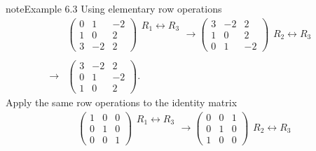 \documentclass[letterpaper,10pt,english]{jupyterBook}
\begin{document}
\begin{sphinxadmonition}{note}{Example 6.3}
\sphinxAtStartPar
Using elementary row operations
\begin{align*}
    &\begin{pmatrix}
        0 & 1 & -2\\
        1 & 0 & 2\\
        3 & -2 & 2
    \end{pmatrix}
    \begin{array}{l} R_1 \leftrightarrow R_3 \\ \phantom{x} \\ \phantom{x} \end{array}
    \longrightarrow 
    \begin{pmatrix}
        3 & -2 & 2\\
        1 & 0 & 2\\
        0 & 1 & -2
    \end{pmatrix}
    \begin{array}{l} \phantom{x} \\ R_2 \leftrightarrow R_3 \\ \phantom{x} \end{array} \\ \\
    \longrightarrow
    &\begin{pmatrix}
        3 & -2 & 2\\
        0 & 1 & -2\\
        1 & 0 & 2
    \end{pmatrix}.
\end{align*}
\sphinxAtStartPar
Apply the same row operations to the identity matrix
\begin{align*}
    &\begin{pmatrix}
        1 & 0 & 0 \\
        0 & 1 & 0 \\
        0 & 0 & 1
    \end{pmatrix}
    \begin{array}{l} R_1 \leftrightarrow R_3 \\ \phantom{x} \\ \phantom{x} \end{array}
    \longrightarrow 
    \begin{pmatrix}
        0 & 0 & 1 \\
        0 & 1 & 0 \\
        1 & 0 & 0
    \end{pmatrix}
    \begin{array}{l} \phantom{x} \\ R_2 \leftrightarrow R_3 \\ \phantom{x} \end{array} \\ \\

\end{align*}
\end{sphinxadmonition}
\end{document}
